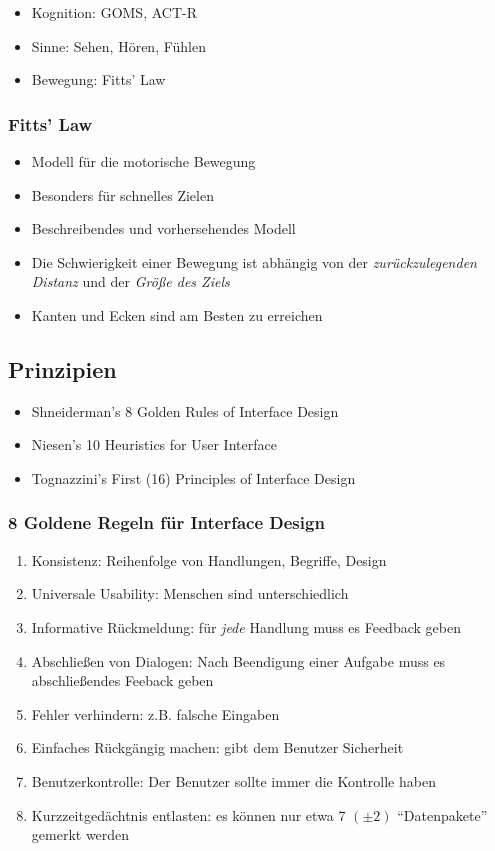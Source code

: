 \begin{itemize}
\item
  Kognition: GOMS, ACT-R
\item
  Sinne: Sehen, Hören, Fühlen
\item
  Bewegung: Fitts' Law
\end{itemize}

\subsubsection{Fitts' Law}

\begin{itemize}
\item
  Modell für die motorische Bewegung
\item
  Besonders für schnelles Zielen
\item
  Beschreibendes und vorhersehendes Modell
\item
  Die Schwierigkeit einer Bewegung ist abhängig von der
  \emph{zurückzulegenden Distanz} und der \emph{Größe des Ziels}
\item
  Kanten und Ecken sind am Besten zu erreichen
\end{itemize}

\subsection{Prinzipien}

\begin{itemize}
\item
  Shneiderman's 8 Golden Rules of Interface Design
\item
  Niesen's 10 Heuristics for User Interface
\item
  Tognazzini's First (16) Principles of Interface Design
\end{itemize}

\subsubsection{8 Goldene Regeln für Interface Design}

\begin{enumerate}[1.]
\item
  Konsistenz: Reihenfolge von Handlungen, Begriffe, Design
\item
  Universale Usability: Menschen sind unterschiedlich
\item
  Informative Rückmeldung: für \emph{jede} Handlung muss es Feedback
  geben
\item
  Abschließen von Dialogen: Nach Beendigung einer Aufgabe muss es
  abschließendes Feeback geben
\item
  Fehler verhindern: z.B. falsche Eingaben
\item
  Einfaches Rückgängig machen: gibt dem Benutzer Sicherheit
\item
  Benutzerkontrolle: Der Benutzer sollte immer die Kontrolle haben
\item
  Kurzzeitgedächtnis entlasten: es können nur etwa 7 $(\pm2)$
  ``Datenpakete'' gemerkt werden
\end{enumerate}

